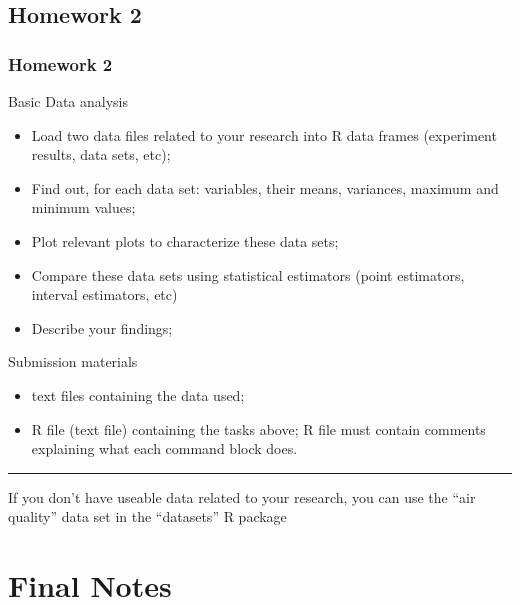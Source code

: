\documentclass[10pt]{beamer}
\begin{document}
\subsection{Homework 2}
\begin{frame}
  \frametitle{Homework 2}
  {\smaller
  \begin{block}{Basic Data analysis}
    \begin{itemize}
    \item Load two data files related to your research into R data
      frames (experiment results, data sets, etc);
    \item Find out, for each data set: variables, their means,
      variances, maximum and minimum values;
    \item Plot relevant plots to characterize these data sets;
    \item Compare these data sets using statistical estimators (point
      estimators, interval estimators, etc)
    \item Describe your findings;
    \end{itemize}
  \end{block}
  \begin{block}{Submission materials}
    \begin{itemize}
    \item {} text files containing the data used;
    \item {} R file (text file) containing the
      tasks above; R file must contain comments explaining what each
      command block does.
    \end{itemize}
  \end{block}}
  \rule{\textwidth}{0.4pt} {\tiny If you don't have useable data
    related to your research, you can use the ``air quality'' data set
    in the ``datasets'' R package}
\end{frame}

\section{Final Notes}
\end{document}
